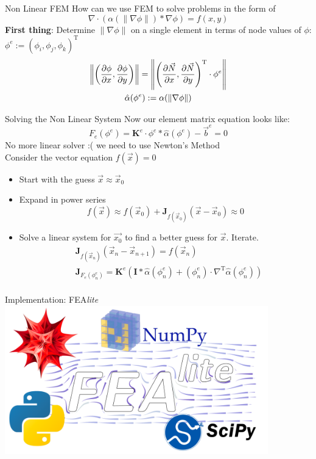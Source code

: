 \documentclass{beamer}
\newcommand\normm[1]{\left\lVert#1\right\rVert}
\begin{document}
    \begin{frame}{Non Linear FEM}
        How can we use FEM to solve problems in the form of
        \[\nabla\cdot\left(\alpha(\|\nabla\phi\|)*\nabla\phi\right)=f(x,y)\]
        \textbf{First thing}: Determine $\|\nabla\phi\|$ on a single element in terms of node values of $\phi$: $\phi^{e}:=\left( \phi_i, \phi_j, \phi_k \right)^{\text{T}}$
        \begin{gather*}
            \normm{\left(\pdv{\phi}{x},\pdv{\phi}{y}\right)}=\normm{\left(\pdv{\vec{N}}{x}, \pdv{\vec{N}}{y} \right)^{\text{T}}\cdot \phi^{e}}\\
            \hat{\alpha}(\phi^e):=\alpha(\normm{\nabla\phi})
        \end{gather*}
    \end{frame}
    \begin{frame}{Solving the Non Linear System}
        Now our element matrix equation looks like:
        \[F_e(\phi^{e})=\mathbf{K}^e\cdot \phi^e*\hat{\alpha}(\phi^{e})-\vec{b}^e=0\]
        No more linear solver :( we need to use Newton's Method\\
        \smallbreak
        Consider the vector equation $f(\vec{x})=0$
        \begin{itemize}
            \item Start with the guess $\vec{x}\approx\vec{x}_0$
            \item Expand in power series
            \[f(\vec{x})\approx f(\vec{x}_0)+\mathbf{J}_{f(\vec{x}_0)}(\vec{x}-\vec{x}_0)\approx 0\]
            \item Solve a linear system for $\vec{x_0}$ to find a better guess for $\vec{x}$.
            Iterate.
            \begin{align*}
                &\mathbf{J}_{f(\vec{x}_n)}\left(\vec{x}_{n}-\vec{x}_{n+1}\right)=f(\vec{x}_{n})\\
                &\mathbf{J}_{F_e(\phi_n^e)}=\mathbf{K}^e\left( \mathbf{I}*\hat{\alpha}(\phi_n^e)+\left(\phi_n^e\right)\cdot \nabla^{\text{T}}\hat{\alpha}(\phi_n^e) \right)\\
            \end{align*}
        \end{itemize}
    \end{frame}
    \begin{frame}{Implementation: FEA\textit{lite}}
        \hspace{-0.72cm}
        \includegraphics[width=4.5in]{technology.pdf}

    \end{frame}
\end{document}
